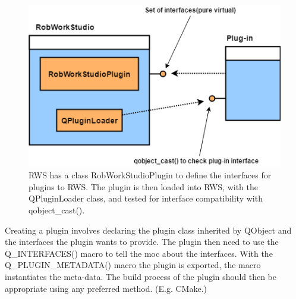 \begin{figure}[h]
	\centering
	\includegraphics[scale=0.55]{Figures/pluginRWS.png}
	\caption{RWS has a class RobWorkStudioPlugin to define the interfaces for plugins to RWS. The plugin is then loaded into RWS, with the QPluginLoader class, and tested for interface compatibility with qobject\_cast().}
	\label{fig:plugin}
\end{figure}

Creating a plugin involves declaring the plugin class inherited by QObject and the interfaces the plugin wants to provide. The plugin then need to use the Q\_INTERFACES() macro to tell the moc about the interfaces. With the Q\_PLUGIN\_METADATA() macro the plugin is exported, the macro instantiates the meta-data. The build process of the plugin should then be appropriate using any preferred method. (E.g. CMake.)







